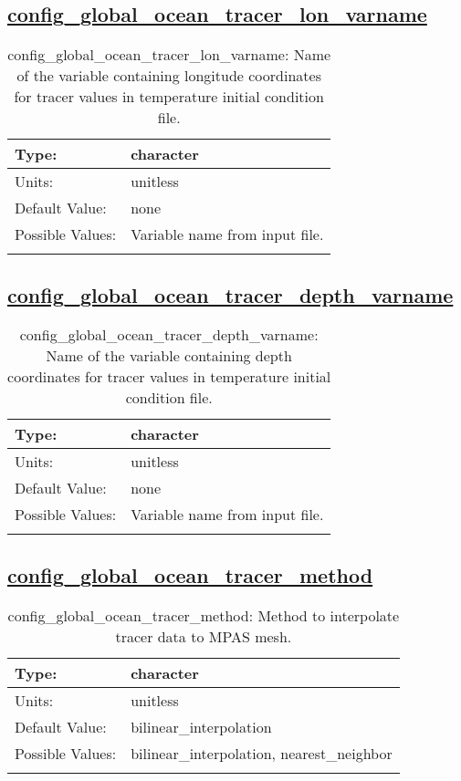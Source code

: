 \subsection[config\_global\_ocean\_tracer\_lon\_varname]{\hyperref[sec:nm_tab_global_ocean]{config\_global\_ocean\_tracer\_lon\_varname}}
\label{subsec:nm_sec_config_global_ocean_tracer_lon_varname}
\begin{center}
\begin{longtable}{| p{2.0in} || p{4.0in} |}
    \hline
    Type: & character \\
    \hline
    Units: & \si{unitless} \\
    \hline
    Default Value: & none \\
    \hline
    Possible Values: & Variable name from input file. \\
    \hline
    \caption{config\_global\_ocean\_tracer\_lon\_varname: Name of the variable containing longitude coordinates for tracer values in temperature initial condition file.}
\end{longtable}
\end{center}
\subsection[config\_global\_ocean\_tracer\_depth\_varname]{\hyperref[sec:nm_tab_global_ocean]{config\_global\_ocean\_tracer\_depth\_varname}}
\label{subsec:nm_sec_config_global_ocean_tracer_depth_varname}
\begin{center}
\begin{longtable}{| p{2.0in} || p{4.0in} |}
    \hline
    Type: & character \\
    \hline
    Units: & \si{unitless} \\
    \hline
    Default Value: & none \\
    \hline
    Possible Values: & Variable name from input file. \\
    \hline
    \caption{config\_global\_ocean\_tracer\_depth\_varname: Name of the variable containing depth coordinates for tracer values in temperature initial condition file.}
\end{longtable}
\end{center}
\subsection[config\_global\_ocean\_tracer\_method]{\hyperref[sec:nm_tab_global_ocean]{config\_global\_ocean\_tracer\_method}}
\label{subsec:nm_sec_config_global_ocean_tracer_method}
\begin{center}
\begin{longtable}{| p{2.0in} || p{4.0in} |}
    \hline
    Type: & character \\
    \hline
    Units: & \si{unitless} \\
    \hline
    Default Value: & bilinear\_interpolation \\
    \hline
    Possible Values: & bilinear\_interpolation, nearest\_neighbor \\
    \hline
    \caption{config\_global\_ocean\_tracer\_method: Method to interpolate tracer data to MPAS mesh.}
\end{longtable}
\end{center}
